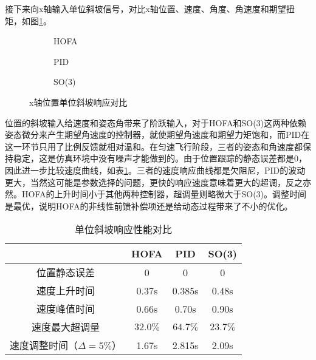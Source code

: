 接下来向x轴输入单位斜坡信号，对比x轴位置、速度、角度、角速度和期望扭矩，如图\ref{matlab_t}。
\begin{figure}[!htp]
  \centering
  \begin{subfigure}[t]{0.49\textwidth}
    \centering
    \caption{HOFA}
  \end{subfigure}\hfill
  \begin{subfigure}[t]{0.49\textwidth}
    \centering
    \caption{PID}
  \end{subfigure}\hfill
  \begin{subfigure}[t]{0.49\textwidth}
    \centering
    \caption{SO(3)}
  \end{subfigure}
  \caption{x轴位置单位斜坡响应对比}
  \label{matlab_t}
\end{figure}

位置的斜坡输入给速度和姿态角带来了阶跃输入，对于HOFA和SO(3)这两种依赖姿态微分来产生期望角速度的控制器，就使期望角速度和期望力矩饱和，而PID在这一环节只用了比例反馈就相对温和。在匀速飞行阶段，三者的姿态和角速度都保持稳定，这是仿真环境中没有噪声才能做到的。由于位置跟踪的静态误差都是0，因此进一步比较速度曲线，如表\ref{matlab斜坡对比}。三者的速度响应曲线都是欠阻尼，PID的波动更大，当然这可能是参数选择的问题，更快的响应速度意味着更大的超调，反之亦然。HOFA的上升时间小于其他两种控制器，超调量则略微大于SO(3)。调整时间是最优，说明HOFA的非线性前馈补偿项还是给动态过程带来了不小的优化。

\begin{table}[!h]
  \centering
  \caption{单位斜坡响应性能对比}
  \begin{tabular}{cccc}
      \toprule
      & HOFA & PID & SO(3) \\
      \midrule
    位置静态误差                  & 0    & 0 & 0 \\
    速度上升时间                   & 0.37s & 0.385s &0.48s \\
    速度峰值时间                  & 0.66s &0.70s  & 0.90s\\
    速度最大超调量                & $32.0\%$ & $64.7\%$  & $23.7\%$\\
    速度调整时间（$\Delta = 5\%$） & 1.67s &2.815s  & 2.09s\\
      \bottomrule
  \end{tabular}
  \label{matlab斜坡对比}
\end{table}
\newpage

